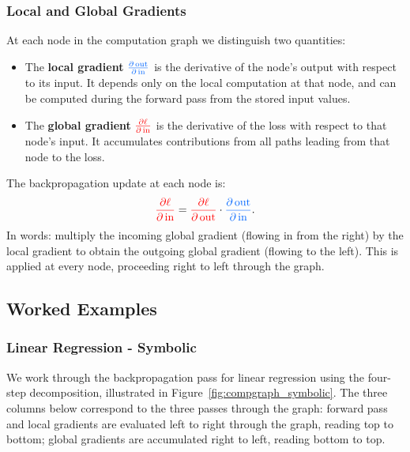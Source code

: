 \subsubsection{Local and Global Gradients}

At each node in the computation graph we distinguish two quantities:

\begin{itemize}
    \item The {\color[HTML]{0066FF}\textbf{local gradient}} ${\color[HTML]{0066FF}\frac{\partial\, \text{out}}{\partial\, \text{in}}}$ is the derivative of the node's output with respect to its input. It depends only on the local computation at that node, and can be computed during the forward pass from the stored input values.
    \item The {\color[HTML]{FF0000}\textbf{global gradient}} ${\color[HTML]{FF0000}\frac{\partial \ell}{\partial\, \text{in}}}$ is the derivative of the loss with respect to that node's input. It accumulates contributions from all paths leading from that node to the loss.
\end{itemize}

The backpropagation update at each node is:
\begin{equation}
{\color[HTML]{FF0000}\frac{\partial \ell}{\partial\, \text{in}}} = {\color[HTML]{FF0000}\frac{\partial \ell}{\partial\, \text{out}}} \cdot {\color[HTML]{0066FF}\frac{\partial\, \text{out}}{\partial\, \text{in}}}.
\end{equation}
In words: multiply the incoming {\color[HTML]{FF0000}global gradient} (flowing in from the right) by the {\color[HTML]{0066FF}local gradient} to obtain the outgoing {\color[HTML]{FF0000}global gradient} (flowing to the left). This is applied at every node, proceeding right to left through the graph.

\subsection{Worked Examples}

\subsubsection{Linear Regression - Symbolic}

We work through the backpropagation pass for linear regression using the four-step decomposition, illustrated in Figure~\ref{fig:compgraph_symbolic}. The three columns below correspond to the three passes through the graph: forward pass and {\color[HTML]{0066FF}local gradients} are evaluated left to right through the graph, reading top to bottom; {\color[HTML]{FF0000}global gradients} are accumulated right to left, reading bottom to top.

